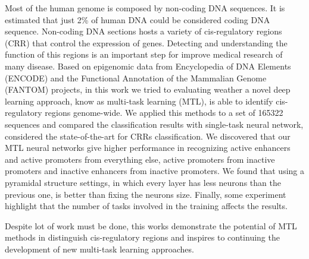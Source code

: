 Most of the human genome is composed by non-coding DNA sequences. It is estimated that just 2\% of human DNA could be considered coding DNA sequence. Non-coding DNA sections hosts a variety of cis-regulatory regions (CRR) that control the expression of genes. Detecting and understanding the function of this regions is an important step for improve medical research of many disease. 
Based on epigenomic data from Encyclopedia of DNA Elements (ENCODE) and the Functional Annotation of the Mammalian Genome (FANTOM) projects, in this work we tried to evaluating weather a novel deep learning approach, know as multi-task learning (MTL), is able to identify cis-regulatory regions genome-wide. We applied this methods to a set of 165322 sequences and compared the classification results with single-task neural network, considered the state-of-the-art for CRRs classification.
We discovered that our MTL neural networks give higher performance in recognizing active enhancers and active promoters from everything else, active promoters from inactive promoters and inactive enhancers from inactive promoters. We found that using a pyramidal structure settings, in which every layer has less neurons than the previous one, is better than fixing the neurons size. Finally, some experiment highlight that the number of tasks involved in the training affects the results. 

Despite lot of work must be done, this works demonstrate the potential of MTL methods in distinguish cis-regulatory regions and inspires to continuing the development of new multi-task learning approaches. 